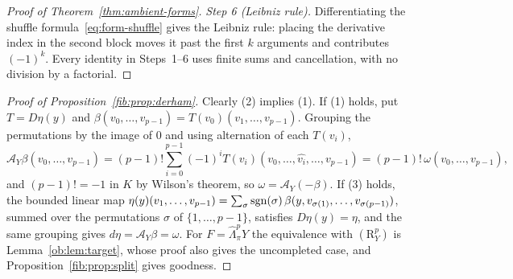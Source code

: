 \begin{proof}[Proof of Theorem~\ref{thm:ambient-forms}]
\emph{Step 6 (Leibniz rule).} Differentiating the shuffle formula~\eqref{eq:form-shuffle} gives the Leibniz rule: placing the derivative index in the second block moves it past the first $k$ arguments and contributes $(-1)^k$. Every identity in Steps~1--6 uses finite sums and cancellation, with no division by a factorial.
\end{proof}

\begin{proof}[Proof of Proposition~\ref{fib:prop:derham}]
Clearly (2) implies (1). If (1) holds, put $T=D\eta(y)$ and $\beta(v_0,\dots,v_{p-1})=T(v_0)(v_1,\dots,v_{p-1})$. Grouping the permutations by the image of $0$ and using alternation of each $T(v_i)$,
\[
 \mathcal A_Y\beta(v_0,\dots,v_{p-1})=(p-1)!\sum_{i=0}^{p-1}(-1)^iT(v_i)(v_0,\dots,\widehat{v_i},\dots,v_{p-1})
 =(p-1)!\,\omega(v_0,\dots,v_{p-1}),
\]
and $(p-1)!=-1$ in $K$ by Wilson's theorem, so $\omega=\mathcal A_Y(-\beta)$. If (3) holds, the bounded linear map $\eta(y)(v_1,\dots,v_{p-1})=\sum_\sigma\operatorname{sgn}(\sigma)\,\beta(y,v_{\sigma(1)},\dots,v_{\sigma(p-1)})$, summed over the permutations $\sigma$ of $\{1,\dots,p-1\}$, satisfies $D\eta(y)=\eta$, and the same grouping gives $d\eta=\mathcal A_Y\beta=\omega$. For $F=\widehat\Lambda^p_\pi Y$ the equivalence with $(\mathrm R^p_Y)$ is Lemma~\ref{ob:lem:target}, whose proof also gives the uncompleted case, and Proposition~\ref{fib:prop:split} gives goodness.
\end{proof}
